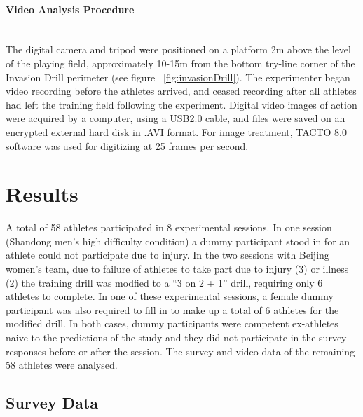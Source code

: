 \documentclass[english]{article}\usepackage[]{graphicx}\usepackage[]{color}
\newcommand{\myparagraph}[1]{\paragraph{#1}\mbox{}\\}
\begin{document}
\myparagraph{Video Analysis Procedure}
The digital camera and tripod were positioned on a platform 2m above the level of the playing field, approximately 10-15m from the bottom try-line corner of the Invasion Drill perimeter (see figure ~\ref{fig:invasionDrill}).  The experimenter began video recording before the athletes arrived, and ceased recording after all athletes had left the training field following the experiment.  Digital video images of action were acquired by a computer, using a USB2.0 cable, and files were saved on an encrypted external hard disk in .AVI format. For image treatment, TACTO 8.0 software was used for digitizing at 25 frames per second.





\section{Results}

A total of 58 athletes participated in 8 experimental sessions. In one session (Shandong men's high difficulty condition) a dummy participant stood in for an athlete could not participate due to injury.  In the two sessions with Beijing women's team, due to failure of athletes to take part due to injury (3) or illness (2) the training drill was modfied to a ``3 on 2 + 1'' drill, requiring only 6 athletes to complete. In one of these experimental sessions, a female dummy participant was also required to fill in to make up a total of 6 athletes for the modified drill.  In both cases, dummy participants were competent ex-athletes naive to the predictions of the study and they did not participate in the survey responses before or after the session.  The survey and video data of the remaining 58 athletes were analysed.

\subsection{Survey Data}
\end{document}
